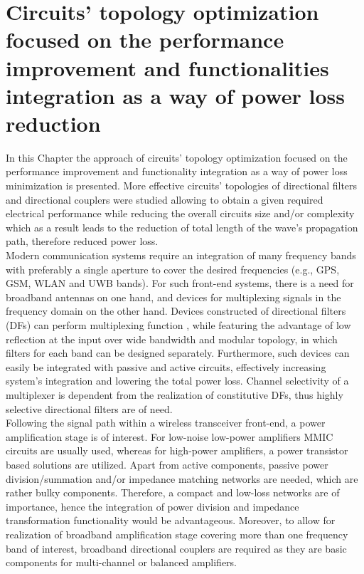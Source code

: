 \chapter{Circuits' topology optimization focused on the performance improvement and functionalities integration as a way of power loss reduction}\label{performance}

\indent In this Chapter the approach of circuits' topology optimization focused on the performance improvement and functionality integration as a way of power loss minimization is presented. More effective circuits' topologies of directional filters and directional couplers were studied allowing to obtain a given required electrical performance while reducing the overall circuits size and/or complexity which as a result leads to the reduction of total length of the wave's propagation path, therefore reduced power loss.
\\
\indent Modern communication systems require an integration of many frequency bands with preferably a single aperture to cover the desired frequencies (e.g., GPS, GSM, WLAN and UWB bands). For such front-end systems, there is a need for broadband antennas on one hand, and devices for multiplexing signals in the frequency domain on the other hand. Devices constructed of directional filters (DFs) can perform multiplexing function \cite{mm_cameron}, while featuring the advantage of low reflection at the input over wide bandwidth and modular topology, in which filters for each band can be designed separately. Furthermore, such devices can easily be integrated with passive and active circuits, effectively increasing system’s integration and lowering the total power loss. Channel selectivity of a multiplexer is dependent from the realization of constitutive DFs, thus highly selective directional filters are of need.
\\
\indent Following the signal path within a wireless transceiver front-end, a power amplification stage is of interest. For low-noise low-power amplifiers MMIC circuits are usually used, whereas for high-power amplifiers, a power transistor based solutions are utilized. Apart from active components, passive power division/summation and/or impedance matching networks are needed, which are rather bulky components. Therefore, a compact and low-loss networks are of importance, hence the integration of power division and impedance transformation functionality \cite{tmtt_wincza_asymmetric_transformers} would be advantageous. Moreover, to allow for realization of broadband amplification stage covering more than one frequency band of interest, broadband directional couplers are required as they are basic components for multi-channel or balanced amplifiers.
